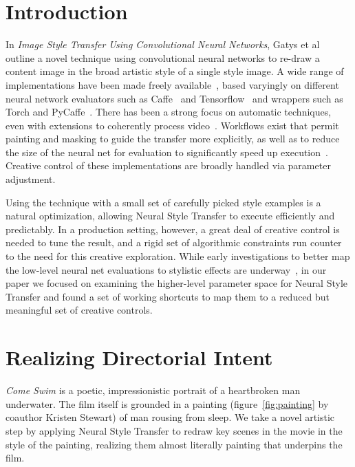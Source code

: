 \documentclass{acmsiggraph}
\begin{document}
%
%


\keywordlist

\conceptlist

\printcopyright

\section{Introduction}
In \textit{Image Style Transfer Using Convolutional Neural Networks}, Gatys et al~\cite{gatys:2015} outline a novel technique using convolutional neural networks to re-draw a content image in the broad artistic style of a single style image. A wide range of implementations have been made freely available~\cite{liu:2016,johnson:2015,athalye:2015}, based varyingly on different neural network evaluators such as Caffe~\cite{jia:2014} and Tensorflow~\cite{abadi:2016} and wrappers such as Torch and PyCaffe~\cite{bahrampour:2015}. There has been a strong focus on automatic techniques, even with extensions to coherently process video~\cite{ruder:2016}. Workflows exist that permit painting and masking to guide the transfer more explicitly, as well as to reduce the size of the neural net for evaluation to significantly speed up execution~\cite{ulyanov:2016}. Creative control of these implementations are broadly handled via parameter adjustment.

Using the technique with a small set of carefully picked style examples is a natural optimization, allowing Neural Style Transfer to execute efficiently and predictably. In a production setting, however, a great deal of creative control is needed to tune the result, and a rigid set of algorithmic constraints run counter to the need for this creative exploration. While early investigations to better map the low-level neural net evaluations to stylistic effects are underway~\cite{li:2017}, in our paper we focused on examining the higher-level parameter space for Neural Style Transfer and found a set of working shortcuts to map them to a reduced but meaningful set of creative controls.

\section{Realizing Directorial Intent}
\textit{Come Swim} is a poetic, impressionistic portrait of a heartbroken man underwater. The film itself is grounded in a painting (figure~\ref{fig:painting} by coauthor Kristen Stewart) of man rousing from sleep. We take a novel artistic step by applying Neural Style Transfer to redraw key scenes in the movie in the style of the painting, realizing them almost literally painting that underpins the film.
\end{document}
